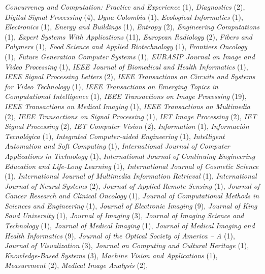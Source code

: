 \documentclass[11pt]{article}
\begin{document}
\begin{itemize}
    \emph{Concurrency and Computation: Practice and Experience} (1), 
    \emph{Diagnostics} (2),
    \emph{Digital Signal Processing} (4),
    \emph{Dyna-Colombia} (1),
    \emph{Ecological Informatics} (1),
    \emph{Electronics} (1),
    \emph{Energy and Buildings} (1),
    \emph{Entropy} (2),
    \emph{Engineering Computations} (1),
    \emph{Expert Systems With Applications} (11),
    \emph{European Radiology} (2),
    \emph{Fibers and Polymers} (1),
    \emph{Food Science and Applied Biotechnology} (1),
    \emph{Frontiers Oncology} (1),
    \emph{Future Generation Computer Systems} (1),
    \emph{EURASIP Journal on Image and Video Processing} (1),
    \emph{IEEE Journal of Biomedical and Health Informatics} (1),
    \emph{IEEE Signal Processing Letters} (2),
    \emph{IEEE Transactions on Circuits and Systems for Video Technology} (1),
    \emph{IEEE Transactions on Emerging Topics in Computational Intelligence} (1),
    \emph{IEEE Transactions on Image Processing} (19),
    \emph{IEEE Transactions on Medical Imaging} (1),
    \emph{IEEE Transactions on Multimedia} (2),
    \emph{IEEE Transactions on Signal Processing} (1),
    \emph{IET Image Processing} (2),
    \emph{IET Signal Processing} (2),
    \emph{IET Computer Vision} (2),
    \emph{Information} (1),
    \emph{Información Tecnológica} (1),
    \emph{Integrated Computer-aided Engineering} (1),
    \emph{Intelligent Automation and Soft Computing} (1),
    \emph{International Journal of Computer Applications in Technology} (1),
    \emph{International  Journal  of Continuing  Engineering  Education and  Life-Long Learning} (1),
    \emph{International Journal of Cosmetic Science} (1),
    \emph{International Journal of Multimedia Information Retrieval} (1),
    \emph{International Journal of Neural Systems} (2),
    \emph{Journal of Applied Remote Sensing} (1),
    \emph{Journal of Cancer Research and Clinical Oncology} (1),
    \emph{Journal of Computational Methods in Sciences and Engineering} (1),
    \emph{Journal of Electronic Imaging} (9),
		\emph{Journal of King Saud University} (1),
    \emph{Journal of Imaging} (3),
    \emph{Journal of Imaging Science and Technology} (1),
    \emph{Journal of Medical Imaging} (1),
    \emph{Journal of Medical Imaging and Health Informatics} (9),
    \emph{Journal of the Optical Society of America -- A} (1),
    \emph{Journal of Visualization} (3),
    \emph{Journal on Computing and Cultural Heritage} (1),
    \emph{Knowledge-Based Systems} (3),
    \emph{Machine Vision and Applications} (1),
    \emph{Measurement} (2),
		\emph{Medical Image Analysis} (2),

\end{itemize}
\end{document}

